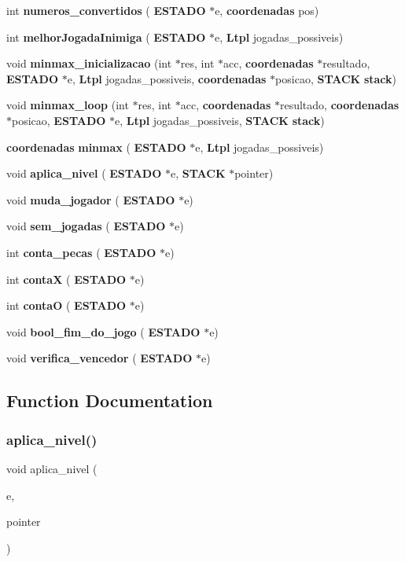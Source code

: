 \begin{DoxyCompactItemize}
\item 
int \textbf{ numeros\+\_\+convertidos} (\textbf{ E\+S\+T\+A\+DO} $\ast$e, \textbf{ coordenadas} pos)
\item 
int \textbf{ melhor\+Jogada\+Inimiga} (\textbf{ E\+S\+T\+A\+DO} $\ast$e, \textbf{ Ltpl} jogadas\+\_\+possiveis)
\item 
void \textbf{ minmax\+\_\+inicializacao} (int $\ast$res, int $\ast$acc, \textbf{ coordenadas} $\ast$resultado, \textbf{ E\+S\+T\+A\+DO} $\ast$e, \textbf{ Ltpl} jogadas\+\_\+possiveis, \textbf{ coordenadas} $\ast$posicao, \textbf{ S\+T\+A\+CK} \textbf{ stack})
\item 
void \textbf{ minmax\+\_\+loop} (int $\ast$res, int $\ast$acc, \textbf{ coordenadas} $\ast$resultado, \textbf{ coordenadas} $\ast$posicao, \textbf{ E\+S\+T\+A\+DO} $\ast$e, \textbf{ Ltpl} jogadas\+\_\+possiveis, \textbf{ S\+T\+A\+CK} \textbf{ stack})
\item 
\textbf{ coordenadas} \textbf{ minmax} (\textbf{ E\+S\+T\+A\+DO} $\ast$e, \textbf{ Ltpl} jogadas\+\_\+possiveis)
\item 
void \textbf{ aplica\+\_\+nivel} (\textbf{ E\+S\+T\+A\+DO} $\ast$e, \textbf{ S\+T\+A\+CK} $\ast$pointer)
\item 
void \textbf{ muda\+\_\+jogador} (\textbf{ E\+S\+T\+A\+DO} $\ast$e)
\item 
void \textbf{ sem\+\_\+jogadas} (\textbf{ E\+S\+T\+A\+DO} $\ast$e)
\item 
int \textbf{ conta\+\_\+pecas} (\textbf{ E\+S\+T\+A\+DO} $\ast$e)
\item 
int \textbf{ contaX} (\textbf{ E\+S\+T\+A\+DO} $\ast$e)
\item 
int \textbf{ contaO} (\textbf{ E\+S\+T\+A\+DO} $\ast$e)
\item 
void \textbf{ bool\+\_\+fim\+\_\+do\+\_\+jogo} (\textbf{ E\+S\+T\+A\+DO} $\ast$e)
\item 
void \textbf{ verifica\+\_\+vencedor} (\textbf{ E\+S\+T\+A\+DO} $\ast$e)
\end{DoxyCompactItemize}


\subsection{Function Documentation}
\mbox{\label{jogar_8c_a2dc4f5a413646aa23ddeacc4fc88840c}} 
\subsubsection{aplica\_nivel()}
{\footnotesize\ttfamily void aplica\+\_\+nivel (\begin{DoxyParamCaption}\item[{\textbf{ E\+S\+T\+A\+DO} $\ast$}]{e,  }\item[{\textbf{ S\+T\+A\+CK} $\ast$}]{pointer }\end{DoxyParamCaption})}

